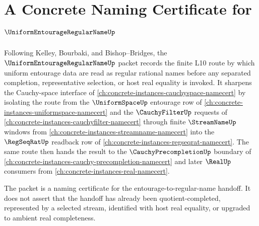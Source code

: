 \chapter{A Concrete Naming Certificate for $\UniformEntourageRegularNameUp$}
\label{ch:concrete-instances-uniform-entourage-regular-name-namecert}

Following Kelley, Bourbaki, and Bishop--Bridges, the $\UniformEntourageRegularNameUp$ packet records the finite L10 route by which uniform entourage data are read as regular rational names before any separated completion, representative selection, or host real equality is invoked. It sharpens the Cauchy-space interface of \autoref{ch:concrete-instances-cauchyspace-namecert} by isolating the route from the $\UniformSpaceUp$ entourage row of \autoref{ch:concrete-instances-uniformspace-namecert} and the $\CauchyFilterUp$ requests of \autoref{ch:concrete-instances-cauchyfilter-namecert} through finite $\StreamNameUp$ windows from \autoref{ch:concrete-instances-streamname-namecert} into the $\RegSeqRatUp$ readback row of \autoref{ch:concrete-instances-regseqrat-namecert}. The same route then hands the result to the $\CauchyPrecompletionUp$ boundary of \autoref{ch:concrete-instances-cauchy-precompletion-namecert} and later $\RealUp$ consumers from \autoref{ch:concrete-instances-real-namecert}.

The packet is a naming certificate for the entourage-to-regular-name handoff. It does not assert that the handoff has already been quotient-completed, represented by a selected stream, identified with host real equality, or upgraded to ambient real completeness.


